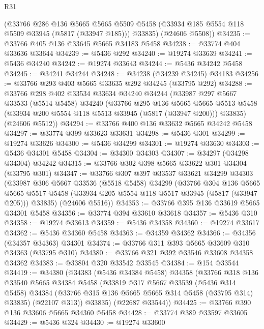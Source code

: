 \begin{lexlean}{R31}
\begin{coremodule}
      (@33766
        @286
        @136
        @5665
        @5665
        @5509
        @5458
        (@33934 @185 @5554 @118 @5509 @33945 (@5817 (@33947 @185)))
        @33835)
      (@24606 @5508))
@34235 := @33766 @405 @136 @33645 @5665 @34183 @5458
@34238 := @33774 @404 @33636 @33644
@34239 := @5436 @292
@34240 := @19274 @33639
@34241 := @5436 @34240
@34242 := @19274 @33643
@34244 := @5436 @34242 @5458
@34245 := @34241 @34244
@34248 := @34238 (@34239 @34245) @34183
@34256 := @33766 @293 @403 @5665 @33635 @292 @34245 (@33795 @292)
@34288 := @33766
    @298
    @402
    @33534
    @33634
    @34240
    @34244
    (@33987
      @297
      @5667
      @33533
      (@5514 @5458)
      @34240
      (@33766
        @295
        @136
        @5665
        @5665
        @5513
        @5458
        (@33934 @200 @5554 @118 @5513 @33945 (@5817 (@33947 @200)))
        @33835)
      (@24606 @5512))
@34294 := @33766 @400 @136 @33632 @5665 @34242 @5458
@34297 := @33774 @399 @33623 @33631
@34298 := @5436 @301
@34299 := @19274 @33626
@34300 := @5436 @34299
@34301 := @19274 @33630
@34303 := @5436 @34301 @5458
@34304 := @34300 @34303
@34307 := @34297 (@34298 @34304) @34242
@34315 := @33766 @302 @398 @5665 @33622 @301 @34304 (@33795 @301)
@34347 := @33766
    @307
    @397
    @33537
    @33621
    @34299
    @34303
    (@33987
      @306
      @5667
      @33536
      (@5518 @5458)
      @34299
      (@33766
        @304
        @136
        @5665
        @5665
        @5517
        @5458
        (@33934 @205 @5554 @118 @5517 @33945 (@5817 (@33947 @205)))
        @33835)
      (@24606 @5516))
@34353 := @33766 @395 @136 @33619 @5665 @34301 @5458
@34356 := @33774 @394 @33610 @33618
@34357 := @5436 @310
@34358 := @19274 @33613
@34359 := @5436 @34358
@34360 := @19274 @33617
@34362 := @5436 @34360 @5458
@34363 := @34359 @34362
@34366 := @34356 (@34357 @34363) @34301
@34374 := @33766 @311 @393 @5665 @33609 @310 @34363 (@33795 @310)
@34380 := @33766 @321 @392 @33546 @33608 @34358 @34362
@34383 := @33804 @320 @33542 @33545
@34384 := @154 @33544
@34419 := @34380
    (@34383
      (@5436 @34384 @5458)
      @34358
      (@33766
        @318
        @136
        @33540
        @5665
        @34384
        @5458
        (@33819
          @317
          @5667
          @33539
          (@5436 @314 @5458)
          @34384
          (@33766 @315 @136 @5665 @5665 @314 @5458 (@33795 @314) @33835)
          (@22107 @313))
        @33835)
      (@22687 @33544))
@34425 := @33766 @390 @136 @33606 @5665 @34360 @5458
@34428 := @33774 @389 @33597 @33605
@34429 := @5436 @324
@34430 := @19274 @33600

\end{coremodule}
\end{lexlean}

